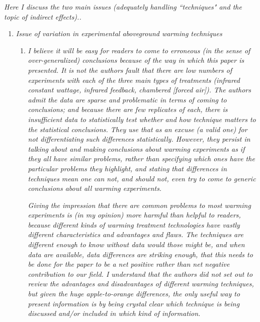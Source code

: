 \documentclass[11pt,a4paper]{letter}
\begin{document}
\begin{letter}{}
\par \emph {Here I discuss the two main issues (adequately handling ``techniques" and the
topic of indirect effects)..}
\begin{enumerate} 
\item \emph{Issue of variation in experimental aboveground warming techniques}
\begin{enumerate}
\item \emph{I believe it will be easy for readers to come to erroneous (in the sense of over-generalized) conclusions because of the way in which this paper is presented. It is not the authors fault that there are low numbers of
experiments with each of the three main types of treatments (infrared constant wattage, infrared feedback, chambered [forced air]). The authors admit the data are sparse and problematic in terms of coming to conclusions; and because there are few replicates of each, there is insufficient data to statistically test whether and how technique matters to the statistical conclusions. They use that as an excuse (a valid one) for not differentiating such differences statistically. However, they persist in talking about and making conclusions about warming experiments as if they all have similar problems, rather than specifying which ones have the particular problems they highlight, and stating that differences in techniques mean one can not, and should not, even try to come to generic conclusions about all warming experiments.}
\par \emph{Giving the impression that there are common problems to most warming experiments is (in my opinion) more harmful than helpful to readers, because different kinds of warming treatment technologies have vastly different characteristics and advantages and flaws. The techniques are different enough to know without data would those might be, and when data are available, data differences are striking enough, that this needs to be done for the paper to be a net positive rather than net negative contribution to our field. I understand that the authors did not set out to review the advantages and disadvantages of different warming techniques, but given the huge apple-to-orange differences, the only useful way to present information is by being crystal clear which technique is being discussed and/or included in which kind of information.}

\end{enumerate}
\end{enumerate}
\end{letter}
\end{document}

